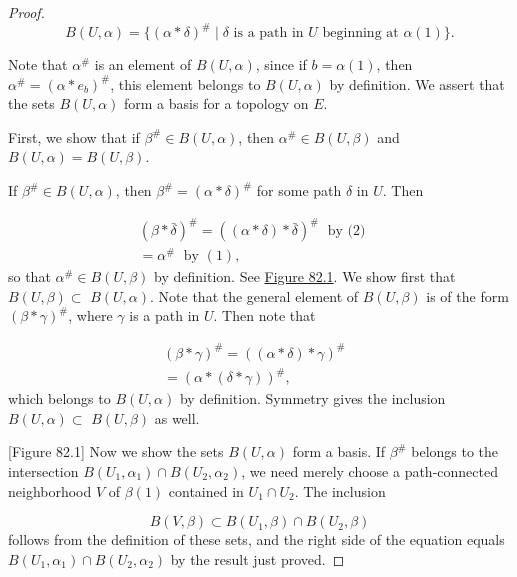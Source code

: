 \begin{proof}
\[
B( {U,\alpha }) = \{ {{( \alpha * \delta ) }^{\# } \mid \delta \text{ is a path in }U\text{ beginning at }\alpha (1) }\}.
\]

Note that \({\alpha }^{\# }\) is an element of \(B( {U,\alpha })\), since if \(b = \alpha (1)\), then \({\alpha }^{\# } = {( \alpha * e_{b}) }^{\# }\), this element belongs to \(B( {U,\alpha })\) by definition. We assert that the sets \(B( {U,\alpha })\) form a basis for a topology on \(E\).

First, we show that if \({\beta }^{\# } \in B( {U,\alpha })\), then \({\alpha }^{\# } \in B( {U,\beta })\) and \(B( {U,\alpha }) = B( {U,\beta })\).

If \({\beta }^{\# } \in B( {U,\alpha })\), then \({\beta }^{\# } = {( \alpha * \delta ) }^{\# }\) for some path \(\delta\) in \(U\). Then

\[
\begin{aligned} {( \beta * \bar{\delta }) }^{\# } = {( ( \alpha * \delta ) * \bar{\delta }) }^{\# }\;\text{ by (2) } & \\ = {\alpha }^{\# }\;\text{ by }(1), & \end{aligned}
\]
so that \({\alpha }^{\# } \in B( {U,\beta })\) by definition. See \hyperref[fig:82.1]{Figure 82.1}. We show first that \(B( {U,\beta }) \subset\) \(B( {U,\alpha })\). Note that the general element of \(B( {U,\beta })\) is of the form \({( \beta * \gamma ) }^{\# }\), where \(\gamma\) is a path in \(U\). Then note that

\[
\begin{aligned} {( \beta * \gamma ) }^{\# } = {( ( \alpha * \delta ) * \gamma ) }^{\# } & \\ = {( \alpha * ( \delta * \gamma ) ) }^{\# }, & \end{aligned}
\]
which belongs to \(B( {U,\alpha })\) by definition. Symmetry gives the inclusion \(B( {U,\alpha }) \subset\) \(B( {U,\beta })\) as well.

[Figure 82.1]
Now we show the sets \(B( {U,\alpha })\) form a basis. If \({\beta }^{\# }\) belongs to the intersection \(B( {U_{1},{\alpha }_{1}}) \cap B( {U_{2},{\alpha }_{2}})\), we need merely choose a path-connected neighborhood \(V\) of \(\beta (1)\) contained in \(U_{1} \cap {U}_{2}\). The inclusion

\[
B( {V,\beta }) \subset B( {U_{1},\beta }) \cap B( {U_{2},\beta })
\]
follows from the definition of these sets, and the right side of the equation equals \(B( {U_{1},{\alpha }_{1}}) \cap B( {U_{2},{\alpha }_{2}})\) by the result just proved.


\end{proof}

